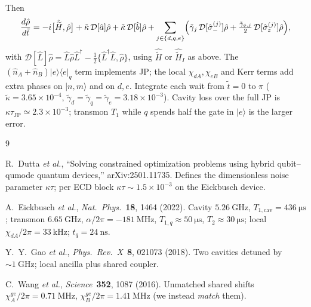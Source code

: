 \documentclass[11pt]{article}
\newcommand{\Pe}[1]{\lvert e\rangle\!\langle e\rvert_{#1}}
\begin{document}
Then
\begin{equation}
\frac{d\hat\rho}{d\tilde t}
=-i\bigl[\hat{\widetilde{H}},\hat\rho\bigr]
+\tilde\kappa\,\mathcal{D}[\hat{a}]\hat\rho
+\tilde\kappa\,\mathcal{D}[\hat{b}]\hat\rho
+\sum_{j\in\{d,q,e\}}
  \Bigl(
    \tilde\gamma_j\,\mathcal{D}[\hat{\sigma}_-^{(j)}]\hat\rho
   +\tfrac{\tilde\gamma_{\phi,j}}{2}\,\mathcal{D}[\hat{\sigma}_z^{(j)}]\hat\rho
  \Bigr),
\label{eq:lindblad}
\end{equation}
with $\mathcal{D}[\hat{L}]\hat\rho=\hat{L}\hat\rho\hat{L}^\dagger
-\tfrac12\{\hat{L}^\dagger\hat{L},\hat\rho\}$,
using $\hat{\widetilde{H}}$ or $\hat{\widetilde{H}}_I$ as above.
The $(\hat{n}_A+\hat{n}_B)\Pe{q}$ term implements JP; the local
$\chi_{dA},\chi_{eB}$ and Kerr terms add extra phases on $\lvert n,m\rangle$
and on $d,e$.
Integrate each wait from $\tilde t=0$ to $\pi$
($\tilde\kappa=3.65\times10^{-4}$,
$\tilde\gamma_d=\tilde\gamma_q=\tilde\gamma_e=3.18\times10^{-3}$).
Cavity loss over the full JP is $\kappa\tau_{\mathrm{JP}}\simeq2.3\times10^{-3}$;
transmon $T_1$ while $q$ spends half the gate in $\lvert e\rangle$ is the
larger error.

\begin{thebibliography}{9}

R.~Dutta \emph{et al.},
``Solving constrained optimization problems using hybrid qubit--qumode
quantum devices,''
arXiv:2501.11735.
Defines the dimensionless noise parameter $\kappa\tau$;
per ECD block $\kappa\tau\sim1.5\times10^{-3}$ on the Eickbusch device.

A.~Eickbusch \emph{et al.},
\emph{Nat.\ Phys.}\ \textbf{18}, 1464 (2022).
Cavity $5.26~\mathrm{GHz}$, $T_{1,\mathrm{cav}}=436~\mathrm{\mu s}$;
transmon $6.65~\mathrm{GHz}$, $\alpha/2\pi=-181~\mathrm{MHz}$,
$T_{1,q}\approx50~\mathrm{\mu s}$, $T_2\approx30~\mathrm{\mu s}$;
local $\chi_{dA}/2\pi=33~\mathrm{kHz}$; $t_q=24~\mathrm{ns}$.

Y.~Y.~Gao \emph{et al.},
\emph{Phys.\ Rev.\ X}\ \textbf{8}, 021073 (2018).
Two cavities detuned by $\sim 1~\mathrm{GHz}$; local ancilla plus shared
coupler.

C.~Wang \emph{et al.},
\emph{Science}\ \textbf{352}, 1087 (2016).
Unmatched shared shifts $\chi_A^{ge}/2\pi=0.71~\mathrm{MHz}$,
$\chi_B^{ge}/2\pi=1.41~\mathrm{MHz}$ (we instead \emph{match} them).

\end{thebibliography}
\end{document}

